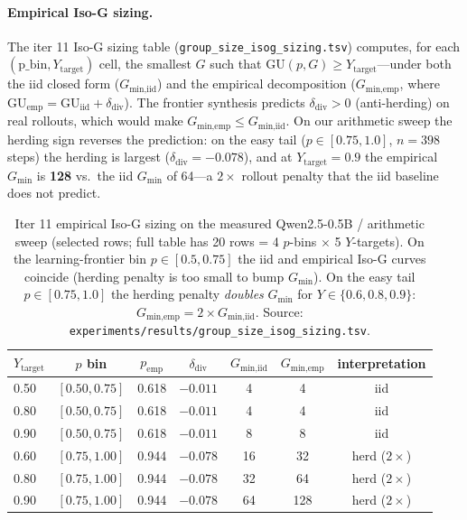 \paragraph{Empirical Iso-G sizing.}
The iter 11 Iso-G sizing table
(\texttt{group\_size\_isog\_sizing.tsv}) computes, for each
$(\mathrm{p\_bin}, Y_\text{target})$ cell, the smallest $G$ such that
$\mathrm{GU}(p, G) \ge Y_\text{target}$---under both the iid closed
form ($G_\text{min,iid}$) and the empirical decomposition
($G_\text{min,emp}$, where $\mathrm{GU}_\text{emp} =
\mathrm{GU}_\text{iid} + \delta_\text{div}$). The frontier synthesis
predicts $\delta_\text{div} > 0$ (anti-herding) on real rollouts,
which would make $G_\text{min,emp} \le G_\text{min,iid}$. On our
arithmetic sweep the herding sign reverses the prediction: on the easy
tail ($p \in [0.75, 1.0]$, $n{=}398$ steps) the herding is largest
($\delta_\text{div} = -0.078$), and at $Y_\text{target} = 0.9$ the
empirical $G_\text{min}$ is \textbf{128} vs.\ the iid $G_\text{min}$
of 64---a $2{\times}$ rollout penalty that the iid baseline does not
predict.

\begin{table}[htbp]
\centering
\small
\begin{tabular}{lcccccc}
\toprule
$Y_\text{target}$ & $p$ bin & $p_\text{emp}$ & $\delta_\text{div}$ & $G_\text{min,iid}$ & $G_\text{min,emp}$ & interpretation \\
\midrule
0.50 & $[0.50, 0.75]$ & 0.618 & $-0.011$ & 4  & 4  & iid \\
0.80 & $[0.50, 0.75]$ & 0.618 & $-0.011$ & 4  & 4  & iid \\
0.90 & $[0.50, 0.75]$ & 0.618 & $-0.011$ & 8  & 8  & iid \\
0.60 & $[0.75, 1.00]$ & 0.944 & $-0.078$ & 16 & 32 & herd ($2{\times}$) \\
0.80 & $[0.75, 1.00]$ & 0.944 & $-0.078$ & 32 & 64 & herd ($2{\times}$) \\
0.90 & $[0.75, 1.00]$ & 0.944 & $-0.078$ & 64 & 128 & herd ($2{\times}$) \\
\bottomrule
\end{tabular}
\caption{Iter 11 empirical Iso-G sizing on the measured
Qwen2.5-0.5B / arithmetic sweep (selected rows; full table has 20
rows = 4 $p$-bins $\times$ 5 $Y$-targets). On the learning-frontier
bin $p \in [0.5, 0.75]$ the iid and empirical Iso-G curves coincide
(herding penalty is too small to bump $G_\text{min}$). On the easy
tail $p \in [0.75, 1.0]$ the herding penalty \emph{doubles} $G_\text{min}$
for $Y \in \{0.6, 0.8, 0.9\}$: $G_\text{min,emp} = 2 \times
G_\text{min,iid}$. Source:
\texttt{experiments/results/group\_size\_isog\_sizing.tsv}.}
\label{tab:groupsize-isog}
\end{table}

